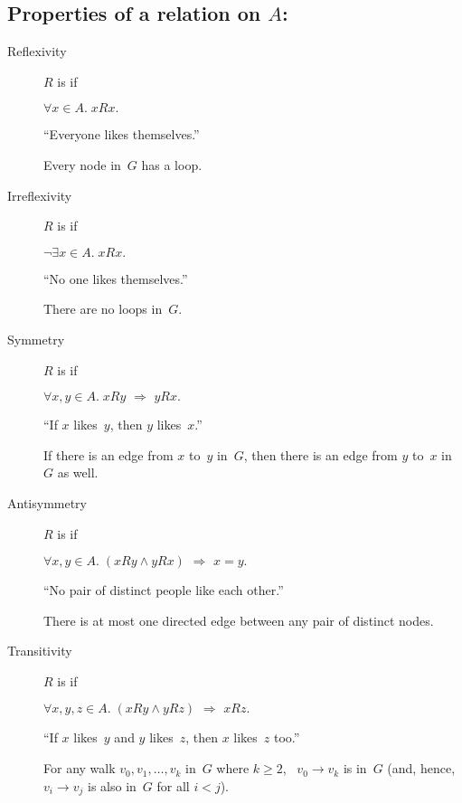 \documentclass[twoside,11pt]{article}
\newcommand{\QAND}{\wedge}
\newcommand{\QIMP}{\,\, \Rightarrow \,\,}
\newcommand{\QIMPLIES}{\,\, \Rightarrow \,\,}
\newcommand{\diredge}[2]{#1 \to #2}
\begin{document}
\subsection*{Properties of a relation on $A$:}
\begin{description}


\item[Reflexivity]

$R$ is  if

$\forall x \in A. \; x R x.$

``Everyone likes themselves.''

Every node in~$G$ has a loop.

\item[Irreflexivity]

$R$ is  if

$ \neg \exists x \in A. \; x R x.$

``No one likes themselves.''

There are no loops in~$G$.

\item[Symmetry]

$R$ is  if

$ \forall x, y \in A. \; x R y \QIMP y R x.$

``If $x$ likes~$y$, then $y$ likes~$x$.''

If there is an edge from $x$ to~$y$ in~$G$, then there is an edge from
$y$ to~$x$ in~$G$ as well.

\item[Antisymmetry]

$R$ is  if

$ \forall x, y \in A.\; (x R y \QAND y R x) \QIMPLIES x = y.$

``No pair of distinct people like each other.''

There is at most one directed edge between any pair of distinct nodes.

\item[Transitivity]

$R$ is  if

$ \forall x, y, z \in A. \; (x R y \QAND y R z) \QIMPLIES x R z.$

``If $x$ likes~$y$ and $y$ likes~$z$, then $x$ likes~$z$ too.''

For any walk $v_0, v_1, \dots, v_k$ in~$G$ where $k \ge 2$,
\ $\diredge{v_0}{v_k}$ is in~$G$ (and, hence, $\diredge{v_i}{v_j}$ is
also in~$G$ for all $i < j$).

\end{description}
\end{document}
